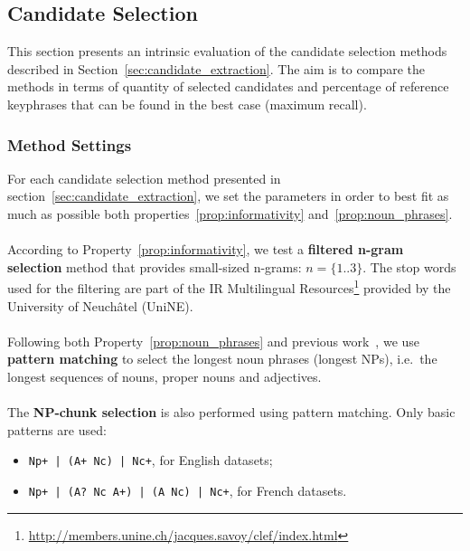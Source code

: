   \subsection{Candidate Selection}
  \label{subsec:candidate_extraction}

    This section presents an intrinsic evaluation of the candidate selection
    methods described in Section~\ref{sec:candidate_extraction}. The aim is to
    compare the methods in terms of quantity of selected candidates and
    percentage of reference keyphrases that can be found in the best case
    (maximum recall).

    \subsubsection{Method Settings}
    \label{subsubsec:method_settings}
      For each candidate selection method presented in
      section~\ref{sec:candidate_extraction}, we set the parameters in order to
      best fit as much as possible both properties~\ref{prop:informativity}
      and~\ref{prop:noun_phrases}.

      \paragraph{}
      According to Property~\ref{prop:informativity}, we test a \textbf{filtered
      n-gram selection} method that provides small-sized n-grams:
      $n = \{1..3\}$. The stop words used for the filtering are part of the IR
      Multilingual
      Resources\footnote{\url{http://members.unine.ch/jacques.savoy/clef/index.html}}
      provided by the University of Neuchâtel (UniNE).

      \paragraph{}
      Following both Property~\ref{prop:noun_phrases} and previous
      work~\cite{hassan2010conundrums}, we use \textbf{pattern matching} to
      select the longest noun phrases (longest NPs), i.e.~the longest sequences
      of nouns, proper nouns and adjectives.

      \paragraph{}
      The \textbf{NP-chunk selection} is also performed using pattern matching.
      Only basic patterns are used:
      \begin{itemize}
        \item{\verb:Np+ | (A+ Nc) | Nc+:, for English datasets;}
        \item{\verb:Np+ | (A? Nc A+) | (A Nc) | Nc+:, for French datasets.}
      \end{itemize}

